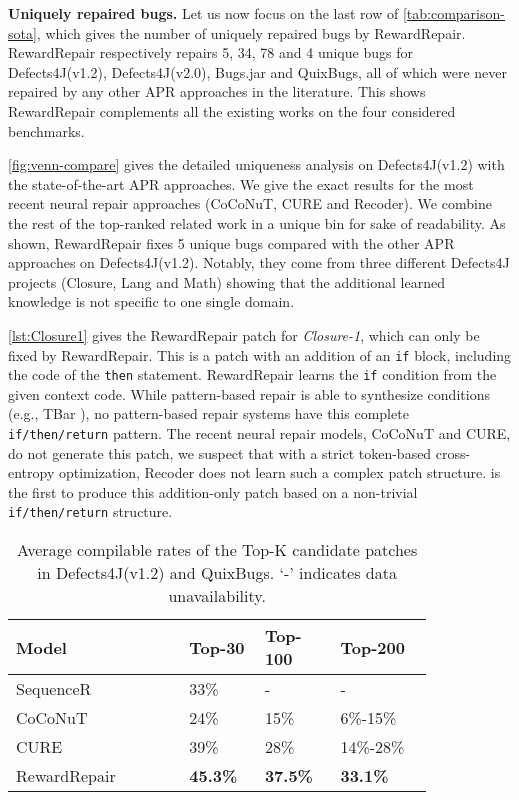 \textbf{Uniquely repaired bugs.}
Let us now focus on the last row of \autoref{tab:comparison-sota}, which gives the number of uniquely repaired bugs by RewardRepair. 
RewardRepair respectively repairs 5, 34, 78 and 4 unique bugs for Defects4J(v1.2), Defects4J(v2.0), Bugs.jar and QuixBugs, all of which were never repaired by any other APR approaches in the literature. 
This shows RewardRepair complements all the existing works on the four considered benchmarks.

\autoref{fig:venn-compare} gives the detailed uniqueness analysis on Defects4J(v1.2) with the state-of-the-art APR approaches. 
We give the exact results for the most recent neural repair approaches (CoCoNuT, CURE and Recoder).
We combine the rest  of the top-ranked related work in a unique bin for sake of readability.
As shown,  RewardRepair fixes 5 unique bugs compared with the other APR approaches on Defects4J(v1.2). Notably, they come from three different Defects4J projects (Closure, Lang and Math) showing that the additional learned knowledge is not specific to one single domain.

\autoref{lst:Closure1} gives the RewardRepair patch for \textit{Closure-1}, which can only be fixed by RewardRepair. This is a patch with an addition of an \texttt{if} block, including the code of the \texttt{then} statement. RewardRepair learns the \texttt{if} condition from the given context code.  
While pattern-based repair is able to synthesize conditions (e.g., TBar \cite{tbar}), no pattern-based repair systems have this complete \texttt{if/then/return} pattern. 
The recent neural repair models, CoCoNuT and CURE, do not generate this patch, we suspect that with a strict token-based cross-entropy optimization, Recoder does not learn such a complex patch structure. 
\approach  is the first to produce this addition-only patch based on a non-trivial \texttt{if/then/return} structure. 

\begin{table}[t!]
\small
\renewcommand{\arraystretch}{1.78}
 \begin{tabular}{p{0.35\linewidth} p{0.15\linewidth} p{0.15\linewidth} p{0.18\linewidth}}
\hline
Model &  \textbf{Top-30} &  \textbf{Top-100} &   \textbf{Top-200} \\

\hline
SequenceR~\cite{SEQUENCER} & 33\% &- &- \\
CoCoNuT~\cite{CoCoNuT} & 24\% & 15\% & 6\%-15\% \\
CURE~\cite{CURE-icse21} & 39\%  & 28\% & 14\%-28\%  \\
\hline
RewardRepair& \textbf{45.3\%}  &\textbf{37.5\%} &\textbf{33.1\%}  \\
\hline

\end{tabular}
\caption{Average compilable rates of the Top-K candidate patches in Defects4J(v1.2) and QuixBugs. ‘-’ indicates data unavailability.}	
\label{tab:compilability}
\end{table}

